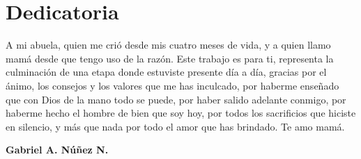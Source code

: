 \chapter*{Dedicatoria}

A mi abuela, quien me cri\'{o} desde mis cuatro meses de vida, y a quien llamo mam\'{a} desde que tengo uso de la raz\'{o}n. Este trabajo es para ti, representa la culminaci\'{o}n de una etapa donde estuviste presente d\'{i}a a d\'{i}a, gracias por el \'{a}nimo, los consejos y los valores que me has inculcado, por haberme ense\~{n}ado que con Dios de la mano todo se puede, por haber salido adelante conmigo, por haberme hecho el hombre de bien que soy hoy, por todos los sacrificios que hiciste en silencio, y m\'{a}s que nada por todo el amor que has brindado. Te amo mam\'{a}.

\begin{flushright}
	\textbf{Gabriel A. N\'{u}\~{n}ez N.}
\end{flushright}
